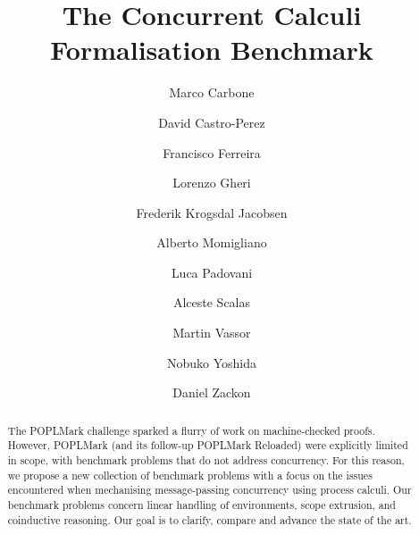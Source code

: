 \documentclass[runningheads]{llncs}
\begin{document}
\title{The Concurrent Calculi Formalisation Benchmark}

\author{
     Marco Carbone 
\and David Castro-Perez 
\and Francisco Ferreira 
\and Lorenzo Gheri 
\and Frederik Krogsdal Jacobsen 
\and Alberto Momigliano 
\and Luca Padovani 
\and Alceste Scalas 
\and Martin Vassor 
\and Nobuko Yoshida 
\and Daniel Zackon 
}



\maketitle

\begin{abstract}
  The POPLMark challenge sparked a flurry of work on machine-checked proofs.
  However, POPLMark (and its follow-up POPLMark Reloaded) were explicitly limited in scope,
  with benchmark problems that do not address concurrency. For this reason, we propose a new collection of benchmark problems with a focus on the issues encountered when mechanising message-passing concurrency using process calculi.
  Our benchmark problems concern linear handling of environments, scope extrusion, and coinductive reasoning.
  Our goal is to clarify, compare and advance the state of the art.

\end{abstract}
\end{document}
